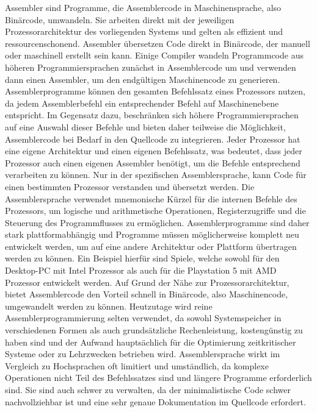 Assembler sind Programme, die Assemblercode in Maschinensprache, also Binärcode, umwandeln. Sie arbeiten direkt mit der jeweiligen Prozessorarchitektur des vorliegenden Systems und gelten als effizient und ressourcenschonend. Assembler übersetzen Code direkt in Binärcode, der manuell oder maschinell erstellt sein kann. Einige Compiler wandeln Programmcode aus höheren Programmiersprachen zunächst in Assemblercode um und verwenden dann einen Assembler, um den endgültigen Maschinencode zu generieren.
Assemblerprogramme können den gesamten Befehlssatz eines Prozessors nutzen, da jedem Assemblerbefehl ein entsprechender Befehl auf Maschinenebene entspricht. Im Gegensatz dazu, beschränken sich höhere Programmiersprachen auf eine Auswahl dieser Befehle und bieten daher teilweise die Möglichkeit, Assemblercode bei Bedarf in den Quellcode zu integrieren.
Jeder Prozessor hat eine eigene Architektur und einen eigenen Befehlssatz, was bedeutet, dass jeder Prozessor auch einen eigenen Assembler benötigt, um die Befehle entsprechend verarbeiten zu können. Nur in der spezifischen Assemblersprache, kann Code für einen bestimmten Prozessor verstanden und übersetzt werden. Die Assemblersprache verwendet mnemonische Kürzel für die internen Befehle des Prozessors, um logische und arithmetische Operationen, Registerzugriffe und die Steuerung des Programmflusses zu ermöglichen. Assemblerprogramme sind daher stark plattformabhängig und Programme müssen möglicherweise komplett neu entwickelt werden, um auf eine andere Architektur oder Plattform übertragen werden zu können. Ein Beispiel hierfür sind Spiele, welche sowohl für den Desktop-PC mit Intel Prozessor als auch für die Playstation 5 mit AMD Prozessor entwickelt werden.
Auf Grund der Nähe zur Prozessorarchitektur, bietet Assemblercode den Vorteil schnell in Binärcode, also Maschinencode, umgewandelt werden zu können. 
Heutzutage wird reine Assemblerprogrammierung selten verwendet, da sowohl Systemspeicher in verschiedenen Formen als auch grundsätzliche Rechenleistung, kostengünstig zu haben sind und der Aufwand hauptsächlich für die Optimierung zeitkritischer Systeme oder zu Lehrzwecken betrieben wird. Assemblersprache wirkt im Vergleich zu Hochsprachen oft limitiert und umständlich, da komplexe Operationen nicht Teil des Befehlssatzes sind und längere Programme erforderlich sind. Sie sind auch schwer zu verwalten, da der minimalistische Code schwer nachvollziehbar ist und eine sehr genaue Dokumentation im Quellcode erfordert.
